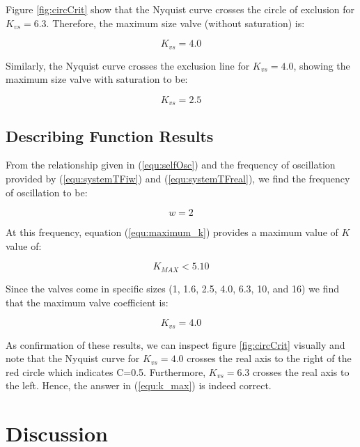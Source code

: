 \documentclass[a4paper, titlepage]{article}
\begin{document}
Figure \ref{fig:circCrit} show that the Nyquist curve crosses the circle of exclusion for $K_{vs}=6.3$.  Therefore, the maximum size valve (without saturation) is:

\begin{equation}
K_{vs} = 4.0
\label{equ:k_max_wo_saturation}
\end{equation}

Similarly, the Nyquist curve crosses the exclusion line for $K_{vs}=4.0$, showing the maximum size valve with saturation to be:

\begin{equation}
K_{vs} = 2.5
\label{equ:k_max_w_saturation}
\end{equation}

\subsection{Describing Function Results}

From the relationship given in (\ref{equ:selfOsc}) and the frequency of oscillation provided by (\ref{equ:systemTFiw}) and (\ref{equ:systemTFreal}), we find the frequency of oscillation to be:

\begin{equation}
w=2
\label{equ:omega_zero}
\end{equation}

At this frequency, equation (\ref{equ:maximum_k}) provides a maximum value of $K$ value of:

\begin{equation}
K_{MAX} < 5.10
\label{equ:k_valid}
\end{equation}

Since the valves come in specific sizes (1, 1.6, 2.5, 4.0, 6.3, 10, and 16) we find that the maximum valve coefficient is:

\begin{equation}
K_{vs} = 4.0
\label{equ:k_max}
\end{equation}

As confirmation of these results, we can inspect figure \ref{fig:circCrit} visually and note that the Nyquist curve for $K_{vs}=4.0$ crosses the real axis to the right of the red circle which indicates C=0.5.  Furthermore, $K_{vs}=6.3$ crosses the real axis to the left.  Hence, the answer in (\ref{equ:k_max}) is indeed correct. 

\section{Discussion}
\end{document}

